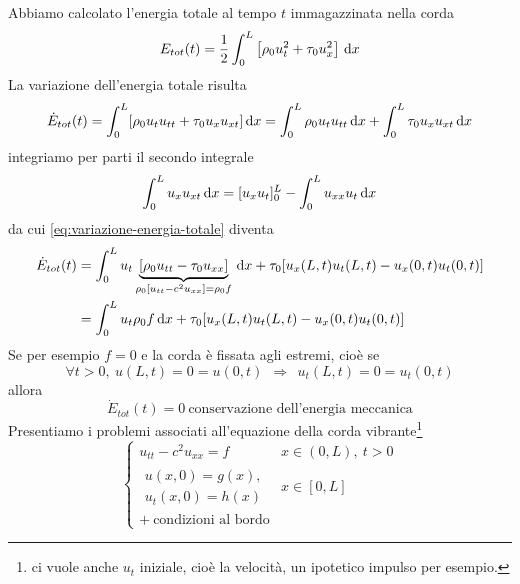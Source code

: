 Abbiamo calcolato l'energia totale al tempo $t$ immagazzinata nella corda
\begin{equation*}
    E_{tot}(t) =\frac{1}{2}\int ^{L}_{0}\left[ \rho _{0} u^{2}_{t} +\tau _{0} u^{2}_{x}\right] \,\mathrm d x
\end{equation*}
La variazione dell'energia totale risulta
\begin{equation}
    \dot{E}_{tot}(t) =\int ^{L}_{0}[ \rho _{0} u_{t} u_{tt} +\tau _{0} u_{x} u_{xt}] \,\mathrm d x=\int ^{L}_{0} \rho _{0} u_{t} u_{tt} \,\mathrm d x+\int ^{L}_{0} \tau _{0} u_{x} u_{xt} \,\mathrm d x
    \label{eq:variazione-energia-totale}
\end{equation}
integriamo per parti il secondo integrale
\begin{equation*}
    \int ^{L}_{0} u_{x} u_{xt} \,\mathrm d x=[ u_{x} u_{t}]^{L}_{0} -\int ^{L}_{0} u_{xx} u_{t} \,\mathrm d x
\end{equation*}
da cui \eqref{eq:variazione-energia-totale} diventa
\begin{align*}
    \dot{E}_{tot}(t) & =\int ^{L}_{0} u_{t}\underbrace{[ \rho _{0} u_{tt} -\tau _{0} u_{xx}]}_{\rho _{0}\left[ u_{tt} -c^{2} u_{xx}\right] =\rho _{0} f} \,\mathrm d x+\tau _{0}[ u_{x}(L,t) u_{t}(L,t) -u_{x}(0,t) u_{t}(0,t)] \\
                     & =\int ^{L}_{0} u_{t} \rho _{0} f\,\mathrm d x+\tau _{0}[ u_{x}(L,t) u_{t}(L,t) -u_{x}(0,t) u_{t}(0,t)]
\end{align*}
Se per esempio $f=0$ e la corda è fissata agli estremi, cioè se
\begin{equation*}
    \forall t >0,\ u(L,t) =0=u(0,t) \ \ \Rightarrow \ \ u_{t}(L,t) =0=u_{t}(0,t)
\end{equation*}
allora
\begin{equation*}
    \dot{E}_{tot}(t) =0\ \text{conservazione dell'energia meccanica}
\end{equation*}
Presentiamo i problemi associati all'equazione della corda vibrante\footnote{ci vuole anche $u_{t}$ iniziale, cioè la velocità, un ipotetico impulso per esempio.}
\begin{equation*}
    \begin{cases}
        u_{tt} -c^{2} u_{xx} =f       & x\in (0,L) ,\ t >0 \\
        \begin{array}{l}
            u(x,0) =g(x) , \\
            u_{t}(x,0) =h(x)
        \end{array}   & x\in [ 0,L]        \\
        +\ \text{condizioni al bordo} &
    \end{cases}
\end{equation*}
